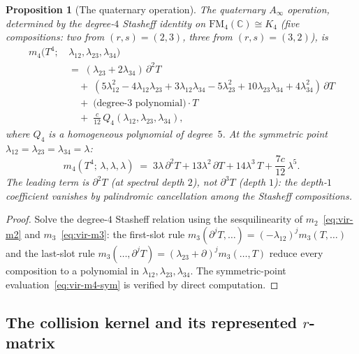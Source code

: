 \documentclass[11pt,reqno]{amsart}
\newtheorem{proposition}[theorem]{Proposition}
\theoremstyle{definition}
\theoremstyle{remark}
\begin{document}
\begin{proposition}[The quaternary operation]
\label{prop:vir-m4}
The quaternary\/ $A_\infty$ operation, determined by the degree-$4$
Stasheff identity on\/ $\mathrm{FM}_4(\mathbb{C}) \cong K_4$
(five compositions: two from $(r,s) = (2,3)$, three from
$(r,s) = (3,2)$), is
\begin{equation}\label{eq:vir-m4}
\begin{aligned}
m_4(T^4;\,&\lambda_{12},\lambda_{23},\lambda_{34})
\\[3pt]
&=\;
(\lambda_{23} + 2\lambda_{34})\,\partial^2 T
\\[2pt]
&\quad +\;
(5\lambda_{12}^2 - 4\lambda_{12}\lambda_{23}
 + 3\lambda_{12}\lambda_{34}
 - 5\lambda_{23}^2 + 10\lambda_{23}\lambda_{34}
 + 4\lambda_{34}^2)\,\partial T
\\[2pt]
&\quad +\; \text{(degree-$3$ polynomial)}\cdot T
\\[2pt]
&\quad +\;
\frac{c}{12}\,Q_4(\lambda_{12},\lambda_{23},\lambda_{34}),
\end{aligned}
\end{equation}
where $Q_4$ is a homogeneous polynomial of degree~$5$.
At the symmetric point\/ $\lambda_{12} = \lambda_{23}
= \lambda_{34} = \lambda$:
\begin{equation}\label{eq:vir-m4-sym}
m_4(T^4;\,\lambda,\lambda,\lambda)
\;=\;
3\lambda\,\partial^2 T
+ 13\lambda^2\,\partial T
+ 14\lambda^3\, T
+ \frac{7c}{12}\,\lambda^5.
\end{equation}
The leading term is $\partial^2 T$ (at spectral depth $2$), not
$\partial^3 T$ (depth $1$): the depth-$1$ coefficient vanishes by
palindromic cancellation among the Stasheff compositions.
\end{proposition}

\begin{proof}
Solve the degree-$4$ Stasheff relation using the sesquilinearity of
$m_2$~\eqref{eq:vir-m2} and $m_3$~\eqref{eq:vir-m3}: the
first-slot rule $m_3(\partial^j T, \ldots)
= (-\lambda_{12})^j m_3(T, \ldots)$ and the last-slot rule
$m_3(\ldots, \partial^j T) = (\lambda_{23}+\partial)^j
m_3(\ldots, T)$ reduce every composition to a polynomial in
$\lambda_{12}, \lambda_{23}, \lambda_{34}$. The symmetric-point
evaluation~\eqref{eq:vir-m4-sym} is verified by direct computation.
\end{proof}

\subsection{The collision kernel and its represented $r$-matrix}
\end{document}
